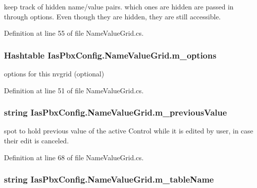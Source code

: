 keep track of hidden name/value pairs. which ones are hidden are passed in through options. Even though they are hidden, they are still accessible. 

Definition at line 55 of file NameValueGrid.cs.\hypertarget{class_ias_pbx_config_1_1_name_value_grid_a536cacb74f82c03d40dee9f8cf4b0da5}{
\subsubsection[{m\_\-options}]{\setlength{\rightskip}{0pt plus 5cm}Hashtable {\bf IasPbxConfig.NameValueGrid.m\_\-options}}}
\label{class_ias_pbx_config_1_1_name_value_grid_a536cacb74f82c03d40dee9f8cf4b0da5}


options for this nvgrid (optional) 

Definition at line 51 of file NameValueGrid.cs.\hypertarget{class_ias_pbx_config_1_1_name_value_grid_a7da8312b72dfd2438197fbb2e32a1daa}{
\subsubsection[{m\_\-previousValue}]{\setlength{\rightskip}{0pt plus 5cm}string {\bf IasPbxConfig.NameValueGrid.m\_\-previousValue}}}
\label{class_ias_pbx_config_1_1_name_value_grid_a7da8312b72dfd2438197fbb2e32a1daa}


spot to hold previous value of the active Control while it is edited by user, in case their edit is canceled. 

Definition at line 68 of file NameValueGrid.cs.\hypertarget{class_ias_pbx_config_1_1_name_value_grid_af6e6d9e0a9f40dd4e3e8d332e1f3018f}{
\subsubsection[{m\_\-tableName}]{\setlength{\rightskip}{0pt plus 5cm}string {\bf IasPbxConfig.NameValueGrid.m\_\-tableName}}}
\label{class_ias_pbx_config_1_1_name_value_grid_af6e6d9e0a9f40dd4e3e8d332e1f3018f}


